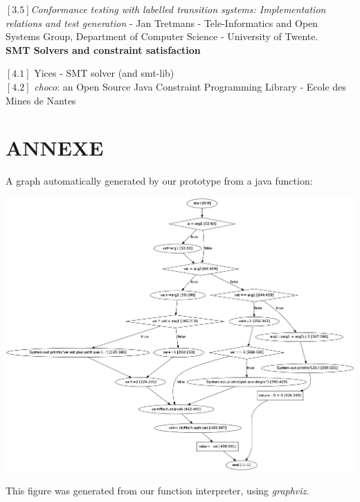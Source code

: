 \documentclass[a4paper]{report}
\begin{document}
$[3.5]$\textit{Conformance testing with labelled transition systems: Implementation relations and test generation} - 
Jan Tretmans - 
Tele-Informatics and Open Systems Group, Department of Computer Science - University of Twente.\\
\newline
\textbf{SMT Solvers and constraint satisfaction}\\
\newline
$[4.1]$ Yices - SMT solver (and smt-lib)\\
\newline
$[4.2]$ \textit{choco}: an Open Source Java Constraint Programming Library - Ecole des Mines de Nantes\\


\chapter*{ANNEXE}

A graph automatically generated by our prototype from a java function:


\centerline{
   \includegraphics[scale=0.25]{../graphviz/realExemple.png}
}
This figure was generated from our function interpreter, using \textit{graphviz}.
\end{document}
